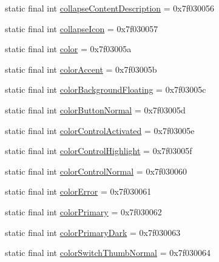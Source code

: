\begin{DoxyCompactItemize}
\item 
static final int \mbox{\hyperlink{classandroid_1_1support_1_1v7_1_1appcompat_1_1_r_1_1attr_af318b94addf84108f62d909296cf4f98}{collapse\+Content\+Description}} = 0x7f030056
\item 
static final int \mbox{\hyperlink{classandroid_1_1support_1_1v7_1_1appcompat_1_1_r_1_1attr_ac297c2f0d5bfe33370c62cbed69c8aec}{collapse\+Icon}} = 0x7f030057
\item 
static final int \mbox{\hyperlink{classandroid_1_1support_1_1v7_1_1appcompat_1_1_r_1_1attr_afb5b2a3525369f5958bc1b9a46cfa5bb}{color}} = 0x7f03005a
\item 
static final int \mbox{\hyperlink{classandroid_1_1support_1_1v7_1_1appcompat_1_1_r_1_1attr_a4fc21f5b8bdbf677fe4c800f10d29cc5}{color\+Accent}} = 0x7f03005b
\item 
static final int \mbox{\hyperlink{classandroid_1_1support_1_1v7_1_1appcompat_1_1_r_1_1attr_a9fdc60194f931ad9a9ad112eecb7e9e9}{color\+Background\+Floating}} = 0x7f03005c
\item 
static final int \mbox{\hyperlink{classandroid_1_1support_1_1v7_1_1appcompat_1_1_r_1_1attr_a3b6363c6669d5acc385b9a473903bca4}{color\+Button\+Normal}} = 0x7f03005d
\item 
static final int \mbox{\hyperlink{classandroid_1_1support_1_1v7_1_1appcompat_1_1_r_1_1attr_a36efdcf7ace558d8b3da55850c9caec1}{color\+Control\+Activated}} = 0x7f03005e
\item 
static final int \mbox{\hyperlink{classandroid_1_1support_1_1v7_1_1appcompat_1_1_r_1_1attr_a2f2a6b1281075d3383d89aadab7d7389}{color\+Control\+Highlight}} = 0x7f03005f
\item 
static final int \mbox{\hyperlink{classandroid_1_1support_1_1v7_1_1appcompat_1_1_r_1_1attr_af9b759f44170b6080c774224c1a74708}{color\+Control\+Normal}} = 0x7f030060
\item 
static final int \mbox{\hyperlink{classandroid_1_1support_1_1v7_1_1appcompat_1_1_r_1_1attr_acc0c3c6ddcf1f659b608d6cae5720000}{color\+Error}} = 0x7f030061
\item 
static final int \mbox{\hyperlink{classandroid_1_1support_1_1v7_1_1appcompat_1_1_r_1_1attr_a6b434238a296c5672fc1cf8b9fec9a75}{color\+Primary}} = 0x7f030062
\item 
static final int \mbox{\hyperlink{classandroid_1_1support_1_1v7_1_1appcompat_1_1_r_1_1attr_ac24f6e897ae5ef7db4ad8ea089ae845d}{color\+Primary\+Dark}} = 0x7f030063
\item 
static final int \mbox{\hyperlink{classandroid_1_1support_1_1v7_1_1appcompat_1_1_r_1_1attr_a575438e4886c8729cd069320f003c7c7}{color\+Switch\+Thumb\+Normal}} = 0x7f030064

\end{DoxyCompactItemize}
